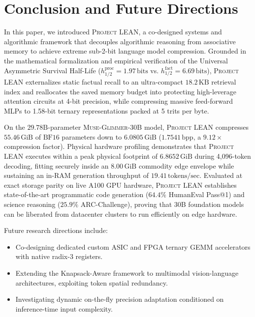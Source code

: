 \documentclass[10pt,twocolumn,letterpaper]{article}
\newcommand{\modelname}{\textsc{Muse-Glimmer-30B}}
\newcommand{\systemname}{\textsc{Project LEAN}}
\begin{document}
\section{Conclusion and Future Directions}
\label{sec:conclusion}

In this paper, we introduced \systemname{}, a co-designed systems and algorithmic framework that decouples algorithmic reasoning from associative memory to achieve extreme sub-2-bit language model compression. Grounded in the mathematical formalization and empirical verification of the Universal Asymmetric Survival Half-Life ($h_{1/2}^{\text{proc}} = 1.97\,\text{bits}$ vs. $h_{1/2}^{\text{fact}} = 6.69\,\text{bits}$), \systemname{} externalizes static factual recall to an ultra-compact $18.2\,\text{KB}$ retrieval index and reallocates the saved memory budget into protecting high-leverage attention circuits at 4-bit precision, while compressing massive feed-forward MLPs to 1.58-bit ternary representations packed at 5 trits per byte.

On the $29.78\text{B}$-parameter \modelname{} model, \systemname{} compresses $55.46\,\text{GiB}$ of $\text{BF16}$ parameters down to \textbf{$6.0805\,\text{GiB}$} ($1.7541\,\text{bpp}$, a \textbf{$9.12\times$} compression factor). Physical hardware profiling demonstrates that \systemname{} executes within a peak physical footprint of \textbf{$6.8652\,\text{GiB}$} during 4,096-token decoding, fitting securely inside an $8.00\,\text{GiB}$ commodity edge envelope while sustaining an in-RAM generation throughput of \textbf{$19.41\,\text{tokens/sec}$}. Evaluated at exact storage parity on live A100 GPU hardware, \systemname{} establishes state-of-the-art programmatic code generation ($64.4\%$ HumanEval Pass@1) and science reasoning ($25.9\%$ ARC-Challenge), proving that 30B foundation models can be liberated from datacenter clusters to run efficiently on edge hardware.

Future research directions include:
\begin{itemize}[leftmargin=*]
    \item Co-designing dedicated custom ASIC and FPGA ternary GEMM accelerators with native radix-3 registers.
    \item Extending the Knapsack-Aware framework to multimodal vision-language architectures, exploiting token spatial redundancy.
    \item Investigating dynamic on-the-fly precision adaptation conditioned on inference-time input complexity.
\end{itemize}
\end{document}
